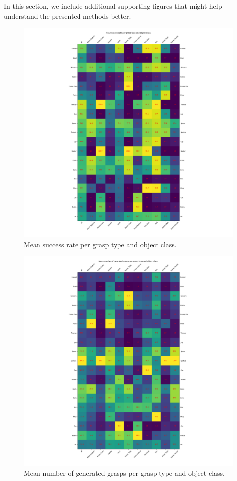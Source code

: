 
\noindent
In this section, we include additional supporting figures that might help understand the presented methods better.

\begin{figure}
\centering
\includegraphics[width=0.8\columnwidth]{images/post-analysis/mean_success_rate_per_grasp_type_and_object_class.png}
\caption{Mean success rate per grasp type and object class.}
\label{fig:post12}
\end{figure}

\begin{figure}
\centering
\includegraphics[width=0.8\columnwidth]{images/post-analysis/mean_number_of_generated_grasps_per_grasp_type_and_object_class.png}
\caption{Mean number of generated grasps per grasp type and object class.}
\label{fig:post13}
\end{figure}